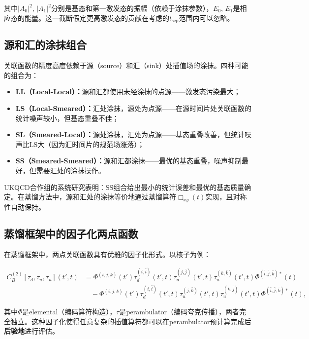 \documentclass[12pt,a4paper]{ctexart}
\theoremstyle{definition}
\begin{document}
其中$|A_0|^2$, $|A_1|^2$分别是基态和第一激发态的振幅（依赖于涂抹参数），$E_0$, $E_1$是相应态的能量。这一截断假定更高激发态的贡献在考虑的$t_{\text{sep}}$范围内可以忽略。

\subsection{源和汇的涂抹组合}

关联函数的精度高度依赖于源（source）和汇（sink）处插值场的涂抹。四种可能的组合为\cite{UKQCD1993}：

\begin{itemize}
    \item \textbf{LL（Local-Local）：}源和汇都使用未经涂抹的点源——激发态污染最大；
    \item \textbf{LS（Local-Smeared）：}汇处涂抹，源处为点源——在源时间片处关联函数的统计噪声较小，但基态重叠不佳；
    \item \textbf{SL（Smeared-Local）：}源处涂抹，汇处为点源——基态重叠改善，但统计噪声比LS大（因为汇时间片的规范场涨落）；
    \item \textbf{SS（Smeared-Smeared）：}源和汇都涂抹——最优的基态重叠，噪声抑制最好，但需要汇处的涂抹操作。
\end{itemize}

UKQCD合作组\cite{UKQCD1993}的系统研究表明：SS组合给出最小的统计误差和最优的基态质量确定。在蒸馏方法中\cite{Peardon2009}，源和汇处的涂抹等价地通过蒸馏算符$\Box_{xy}(t)$实现，且对称性自动保持。

\subsection{蒸馏框架中的因子化两点函数}

在蒸馏框架中，两点关联函数具有优雅的因子化形式\cite{Peardon2009,NoteGluonPDFs}。以核子为例：

\begin{equation}
\begin{aligned}
C^{(2)}_B[\tau_d, \tau_u, \tau_u](t', t) &= \Phi^{(i,j,k)}(t') \tau^{(i,\bar{i})}_d(t',t) \tau^{(j,\bar{j})}_u(t',t) \tau^{(k,\bar{k})}_u(t',t) \Phi^{(\bar{i},\bar{j},\bar{k})*}(t) \\
&\quad - \Phi^{(i,j,k)}(t') \tau^{(i,\bar{i})}_d(t',t) \tau^{(j,\bar{k})}_u(t',t) \tau^{(k,\bar{j})}_u(t',t) \Phi^{(\bar{i},\bar{j},\bar{k})*}(t),
\end{aligned}
\label{eq:distilled_2pt}
\end{equation}

其中$\Phi$是elemental（编码算符构造），$\tau$是perambulator（编码夸克传播），两者完全独立。这种因子化使得任意复杂的插值算符都可以在perambulator预计算完成后\textbf{后验地}进行评估。
\end{document}
